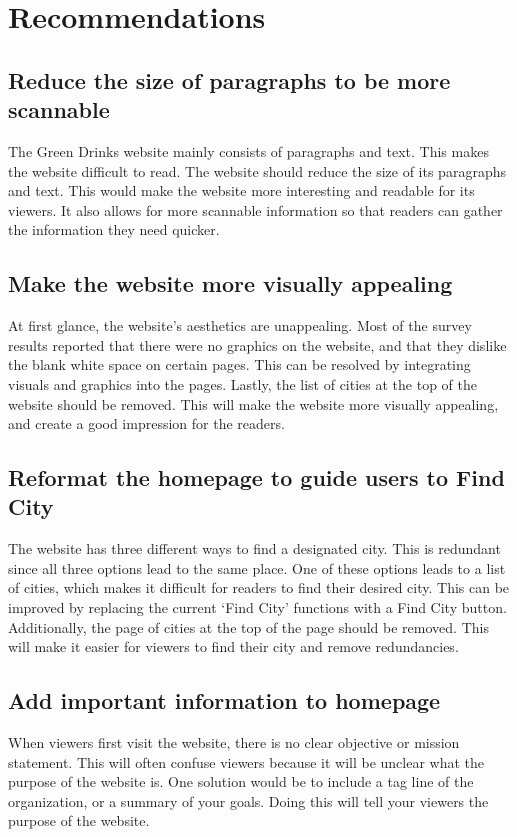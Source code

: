 \documentclass[12pt]{article}
\newcommand\skiplines[1]{\vspace{#1\baselineskip}}
\begin{document}
\section{Recommendations }
\subsection*{Reduce the size of paragraphs to be more scannable}
The Green Drinks website mainly consists of paragraphs and text. This makes the website difficult to read. The website should reduce the size of its paragraphs and text. This would make the website more interesting and readable for its viewers. It also allows for more scannable information so that readers can gather the information they need quicker.


\subsection*{Make the website more visually appealing}
At first glance, the website’s aesthetics are unappealing. Most of the survey results reported that there were no graphics on the website, and that they dislike the blank white space on certain pages. This can be resolved by integrating visuals and graphics into the pages. Lastly, the list of cities at the top of the website should be removed. This will make the website more visually appealing, and create a good impression for the readers.


\subsection*{Reformat the homepage to guide users to Find City}
The website has three different ways to find a designated city. This is redundant since all three options lead to the same place. One of these options leads to a list of cities, which makes it difficult for readers to find their desired city. This can be improved by replacing the current ‘Find City’ functions with a Find City button. Additionally, the page of cities at the top of the page should be removed. This will make it easier for viewers to find their city and remove redundancies.


\subsection*{Add important information to homepage}
When viewers first visit the website, there is no clear objective or mission statement. This will often confuse viewers because it will be unclear what the purpose of the website is. One solution would be to include a tag line of the organization, or a summary of your goals. Doing this will tell your viewers the purpose of the website. \skiplines{4}
\end{document}
